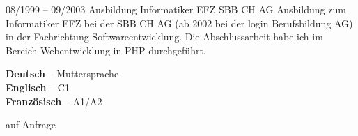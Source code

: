\documentclass[10pt]{../developercv} %
\begin{document}

\vspace{0.5cm} %

\begin{entrylist}
	\entry
	{\footnotesize 08/1999 -- 09/2003}
	{Ausbildung Informatiker EFZ}
	{SBB CH AG}
	{Ausbildung zum Informatiker EFZ bei der SBB CH AG (ab 2002 bei der login Berufsbildung AG) in der Fachrichtung Softwareentwicklung. Die Abschlussarbeit habe ich im Bereich Webentwicklung in PHP durchgeführt.}
\end{entrylist}


\vspace{0.5cm} %
\begin{minipage}[t]{0.45\textwidth} %
	\vspace{-\baselineskip} %


	\textbf{Deutsch} -- Muttersprache\\
	\textbf{Englisch} -- C1\\
	\textbf{Französisch} -- A1/A2
\end{minipage}
\hfill %
\begin{minipage}[t]{0.45\textwidth} %
	\vspace{-\baselineskip} %


	auf Anfrage
\end{minipage}

\end{document}
